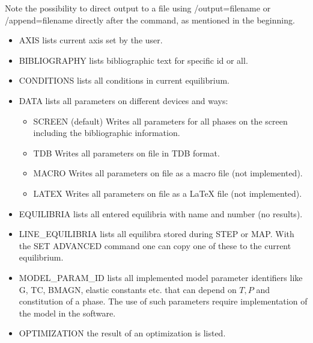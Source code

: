 \documentclass[12pt]{article}
\begin{document}
\begin{itemize}
  Note the possibility to direct output to a file using
  /output=filename or /append=filename directly after the command, as
  mentioned in the beginning.
  \begin{itemize}
  \item AXIS lists current axis set by the user.
  \item BIBLIOGRAPHY lists bibliographic text for specific id or all.
  \item CONDITIONS lists all conditions in current equilibrium.
  \item DATA lists all parameters on different devices and ways:
    \begin{itemize}
    \item SCREEN (default) Writes all parameters for all phases on the
      screen including the bibliographic information.
    \item TDB Writes all parameters on file in TDB format.
    \item MACRO Writes all parameters on file as a macro file (not
      implemented).
    \item LATEX Writes all parameters on file as a LaTeX file (not
      implemented).
    \end{itemize}
  \item EQUILIBRIA lists all entered equilibria with name and number (no
    results).
  \item LINE\_EQUILIBRIA lists all equilibra stored during STEP or MAP.
    With the SET ADVANCED command one can copy one of these to the
    current equilibrium.
  \item MODEL\_PARAM\_ID lists all implemented model parameter
    identifiers like G, TC, BMAGN, elastic constants etc. that can
    depend on $T, P$ and constitution of a phase.  The use of such
    parameters require implementation of the model in the software.
  \item OPTIMIZATION the result of an optimization is listed.

\end{itemize}
\end{itemize}
\end{document}
